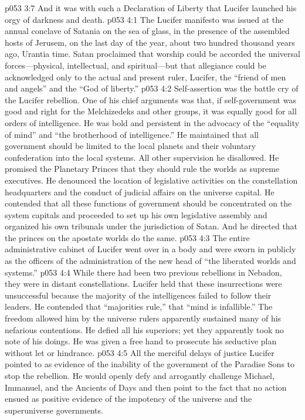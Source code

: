 \pc \vs p053 3:7 And it was with such a Declaration of Liberty that Lucifer launched his orgy of darkness and death.
\vs p053 4:1 The Lucifer manifesto was issued at the annual conclave of Satania on the sea of glass, in the presence of the assembled hosts of Jerusem, on the last day of the year, about two hundred thousand years ago, Urantia time. Satan proclaimed that worship could be accorded the universal forces---physical, intellectual, and spiritual---but that allegiance could be acknowledged only to the actual and present ruler, Lucifer, the “friend of men and angels” and the “God of liberty.”
\vs p053 4:2 Self\hyp{}assertion was the battle cry of the Lucifer rebellion. One of his chief arguments was that, if self\hyp{}government was good and right for the Melchizedeks and other groups, it was equally good for all orders of intelligence. He was bold and persistent in the advocacy of the “equality of mind” and “the brotherhood of intelligence.” He maintained that all government should be limited to the local planets and their voluntary confederation into the local systems. All other supervision he disallowed. He promised the Planetary Princes that they should rule the worlds as supreme executives. He denounced the location of legislative activities on the constellation headquarters and the conduct of judicial affairs on the universe capital. He contended that all these functions of government should be concentrated on the system capitals and proceeded to set up his own legislative assembly and organized his own tribunals under the jurisdiction of Satan. And he directed that the princes on the apostate worlds do the same.
\vs p053 4:3 The entire administrative cabinet of Lucifer went over in a body and were sworn in publicly as the officers of the administration of the new head of “the liberated worlds and systems.”
\pc \vs p053 4:4 While there had been two previous rebellions in Nebadon, they were in distant constellations. Lucifer held that these insurrections were unsuccessful because the majority of the intelligences failed to follow their leaders. He contended that “majorities rule,” that “mind is infallible.” The freedom allowed him by the universe rulers apparently sustained many of his nefarious contentions. He defied all his superiors; yet they apparently took no note of his doings. He was given a free hand to prosecute his seductive plan without let or hindrance.
\pc \vs p053 4:5 All the merciful delays of justice Lucifer pointed to as evidence of the inability of the government of the Paradise Sons to stop the rebellion. He would openly defy and arrogantly challenge Michael, Immanuel, and the Ancients of Days and then point to the fact that no action ensued as positive evidence of the impotency of the universe and the superuniverse governments.
